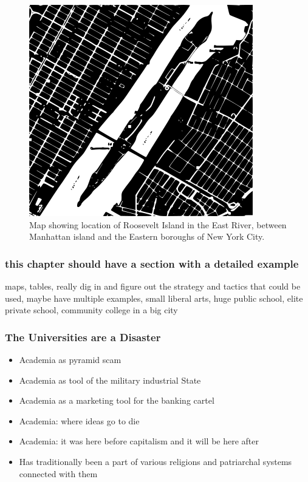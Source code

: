 \begin{figure}[htbp]
\centering
\includegraphics{images/roosevelt.png}
\caption{Map showing location of Roosevelt Island in the East River,
between Manhattan island and the Eastern boroughs of New York City.}
\end{figure}

\subsubsection{this chapter should have a section with a detailed
example}\label{this-chapter-should-have-a-section-with-a-detailed-example}

maps, tables, really dig in and figure out the strategy and tactics that
could be used, maybe have multiple examples, small liberal arts, huge
public school, elite private school, community college in a big city

\subsubsection{The Universities are a
Disaster}\label{the-universities-are-a-disaster}

\begin{itemize}
\item
  Academia as pyramid scam
\item
  Academia as tool of the military industrial State
\item
  Academia as a marketing tool for the banking cartel
\item
  Academia: where ideas go to die
\item
  Academia: it was here before capitalism and it will be here after
\item
  Has traditionally been a part of various religions and patriarchal
  systems connected with them
\end{itemize}


